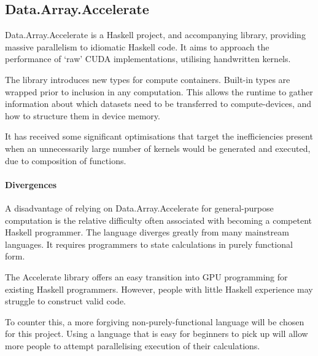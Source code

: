 \subsection{Data.Array.Accelerate}

Data.Array.Accelerate is a Haskell project\cite{daa}, and accompanying library\cite{daalib}, providing massive parallelism to idiomatic Haskell code. It aims to approach the performance of `raw' \ac{CUDA} implementations, utilising handwritten kernels.

The library introduces new types for compute containers. Built-in types are wrapped prior to inclusion in any computation. This allows the runtime to gather information about which datasets need to be transferred to compute-devices, and how to structure them in device memory.

It has received some significant optimisations\cite{daaopt} that target the inefficiencies present when an unnecessarily large number of kernels would be generated and executed, due to composition of functions.

\paragraph*{Divergences}
A disadvantage of relying on Data.Array.Accelerate for general-purpose computation is the relative difficulty often associated with becoming a competent Haskell programmer. The language diverges greatly from many mainstream languages.  It requires programmers to state calculations in purely functional form.

The Accelerate library offers an easy transition into \ac{GPU} programming for existing Haskell programmers. However, people with little Haskell experience may struggle to construct valid code.

 To counter this, a more forgiving non-purely-functional language will be chosen for this project. Using a language that is easy for beginners to pick up will allow more people to attempt parallelising execution of their calculations.

